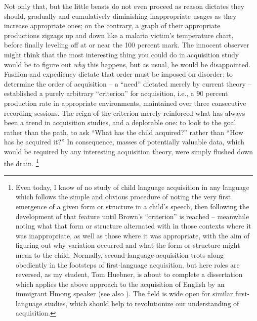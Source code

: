 Not only that, but the little beasts do not even proceed as reason dictates they should, gradually and cumulatively diminishing inappropriate usages as they increase appropriate ones; on the contrary, a graph of their appropriate productions zigzags up and down like a malaria victim's temperature chart, before finally leveling off at or near the 100 percent mark. The innocent observer might think that the most interesting thing you could do in acquisition study would be to figure out \textit{why} this happens, but as usual, he would be disappointed. Fashion and expediency dictate that order must be imposed on disorder: to determine the order of acquisition -- a ``need'' dictated merely by current theory -- \citet{Brown1973} established a purely arbitrary ``criterion'' for acquisition, i.e., a 90 percent production rate in appropriate environments, maintained over three consecutive recording sessions. The reign of the criterion merely reinforced what has always been
a trend in acquisition studies, and a deplorable one: to look to the goal rather than the path, to ask ``What has the child acquired?'' rather than ``How has he acquired it?'' In consequence, masses of potentially valuable data, which would be required by any interesting acquisition theory, were simply flushed down the drain.%
\footnote{Even today, I know of no study of child language acquisition in any language which follows the simple and obvious procedure of noting the very first emergence of a given form or structure in a child's speech, then following the development of that feature until Brown's ``criterion'' is reached -- meanwhile noting what that form or structure alternated with in those contexts where it was inappropriate, as well as those where it was appropriate, with the aim of figuring out why variation occurred and what the form or structure might mean to the child. Normally, second-language acquisition trots along obediently in the footsteps of first-language acquisition, but here roles are reversed, as my student, Tom Huebner, is about to complete a dissertation which applies the above approach to the acquisition of English by an immigrant Hmong speaker (see also \citealt{Huebner1979}). The field is wide open for similar first-language studies, which should help to revolutionize our understanding of acquisition.\label{Fn1}}

